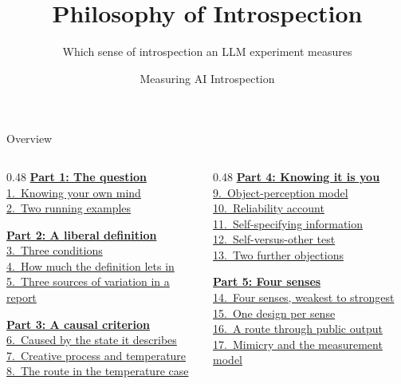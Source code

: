 \documentclass[aspectratio=169,11pt]{beamer}
\title{Philosophy of Introspection}
\subtitle{Which sense of introspection an LLM experiment measures}
\author{Measuring AI Introspection}
\date{}
\begin{document}
\begin{frame}
\vspace*{-0.6cm}\titlepage
\end{frame}

\begin{frame}{Overview}\footnotesize
\begin{columns}[T]
\begin{column}{0.48\textwidth}
\hyperlink{part1}{\textbf{Part 1: The question}}\\[0.15em]
{\scriptsize%
\quad\hyperlink{hungry}{1.~Knowing your own mind}\\%
\quad\hyperlink{examples}{2.~Two running examples}%
}\vspace{0.3em}

\hyperlink{part2}{\textbf{Part 2: A liberal definition}}\\[0.15em]
{\scriptsize%
\quad\hyperlink{kfdef}{3.~Three conditions}\\%
\quad\hyperlink{kfloose}{4.~How much the definition lets in}\\%
\quad\hyperlink{kfsources}{5.~Three sources of variation in a report}%
}\vspace{0.3em}

\hyperlink{part3}{\textbf{Part 3: A causal criterion}}\\[0.15em]
{\scriptsize%
\quad\hyperlink{causal}{6.~Caused by the state it describes}\\%
\quad\hyperlink{twocases}{7.~Creative process and temperature}\\%
\quad\hyperlink{temp}{8.~The route in the temperature case}%
}
\end{column}
\begin{column}{0.48\textwidth}
\hyperlink{part4}{\textbf{Part 4: Knowing it is you}}\\[0.15em]
{\scriptsize%
\quad\hyperlink{objperc}{9.~Object-perception model}\\%
\quad\hyperlink{reliab}{10.~Reliability account}\\%
\quad\hyperlink{selfspec}{11.~Self-specifying information}\\%
\quad\hyperlink{selfother}{12.~Self-versus-other test}\\%
\quad\hyperlink{further}{13.~Two further objections}%
}\vspace{0.3em}

\hyperlink{part5}{\textbf{Part 5: Four senses}}\\[0.15em]
{\scriptsize%
\quad\hyperlink{ladder}{14.~Four senses, weakest to strongest}\\%
\quad\hyperlink{designs}{15.~One design per sense}\\%
\quad\hyperlink{confound}{16.~A route through public output}\\%
\quad\hyperlink{measmodel}{17.~Mimicry and the measurement model}%
}\vspace{0.3em}


\end{column}
\end{columns}
\end{frame}
\end{document}
